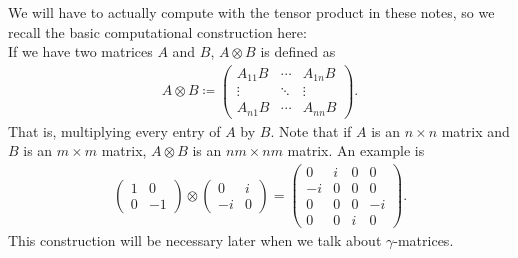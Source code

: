 \documentclass[11pt]{article}
\begin{document}
\begin{nnote}
    We will have to actually compute with the tensor product in these
    notes, so we recall the basic computational construction here:\\

    \noin
    If we have two matrices $A$ and $B$, $A \otimes B$
    is defined as
    \begin{align*}
        A \otimes B \coloneqq \begin{pmatrix}
            A_{11} B & \cdots & A_{1n} B\\
            \vdots & \ddots & \vdots\\
            A_{n1} B & \cdots & A_{nn} B
        \end{pmatrix}.
    \end{align*}
    That is, multiplying every entry of $A$ by $B$.
    Note that if $A$ is an $n \times n$ matrix and
    $B$ is an $m \times m$ matrix, $A \otimes B$
    is an $nm \times nm$ matrix.
    An example is
    \begin{align*}
        \begin{pmatrix}
            1 & 0\\
            0 & -1
        \end{pmatrix}
        \otimes
        \begin{pmatrix}
            0 & i\\
            -i & 0
        \end{pmatrix}
        = \begin{pmatrix}
            0 & i & 0 & 0\\
            -i & 0 & 0 & 0\\
            0 & 0 & 0 & -i\\
            0 & 0 & i & 0
        \end{pmatrix}.
    \end{align*}
    This construction will be necessary later when we talk about
    $\gamma$-matrices.
\end{nnote}
\end{document}
